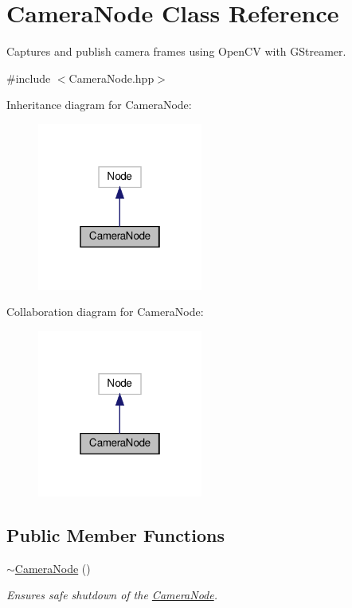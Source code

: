 \hypertarget{classCameraNode}{}\section{Camera\+Node Class Reference}
\label{classCameraNode}


Captures and publish camera frames using Open\+CV with G\+Streamer.  




{\ttfamily \#include $<$Camera\+Node.\+hpp$>$}



Inheritance diagram for Camera\+Node\+:
\nopagebreak
\begin{figure}[H]
\begin{center}
\leavevmode
\includegraphics[width=154pt]{classCameraNode__inherit__graph}
\end{center}
\end{figure}


Collaboration diagram for Camera\+Node\+:
\nopagebreak
\begin{figure}[H]
\begin{center}
\leavevmode
\includegraphics[width=154pt]{classCameraNode__coll__graph}
\end{center}
\end{figure}
\subsection*{Public Member Functions}
\begin{DoxyCompactItemize}
\item 
\hyperlink{classCameraNode_ab3a466dc9357b5200fb6843a6d64c5c8}{$\sim$\+Camera\+Node} ()
\begin{DoxyCompactList}\small\item\em Ensures safe shutdown of the \hyperlink{classCameraNode}{Camera\+Node}. \end{DoxyCompactList}\end{DoxyCompactItemize}
